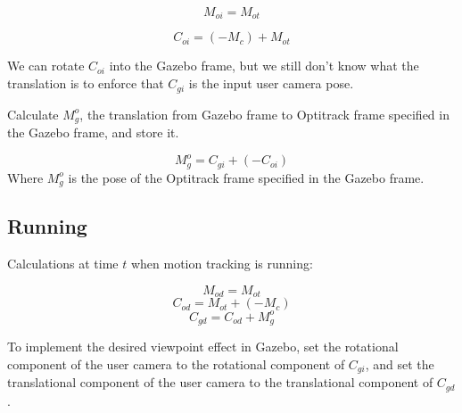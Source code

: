 \documentclass[11pt, letterpaper]{article}
\begin{document}
\begin{equation}
M_{oi} = M_{ot}
\end{equation}

\begin{equation}
C_{oi} = (-M_c) + M_{ot}
\end{equation}

We can rotate $C_{oi}$ into the Gazebo frame, but we still don't know what the translation is to enforce that $C_{gi}$ is the input user camera pose.

Calculate $M^o_g$, the translation from Gazebo frame to Optitrack frame specified in the Gazebo frame, and store it.

\begin{equation}
M_g^o = C_{gi} + (-C_{oi})
\end{equation}
Where $M^o_g$ is the pose of the Optitrack frame specified in the Gazebo frame.

\subsection{Running}
Calculations at time $t$ when motion tracking is running:

\begin{equation}
M_{od} = M_{ot}
\end{equation}
\begin{equation}
C_{od} = M_{ot} + (-M_c)
\end{equation}
\begin{equation}
C_{gd} = C_{od} + M_g^o
\end{equation}

To implement the desired viewpoint effect in Gazebo, set the rotational component of the user camera to the rotational component of $C_{gi}$, and set the translational component of the user camera to the translational component of $C_{gd}$.
\end{document}
